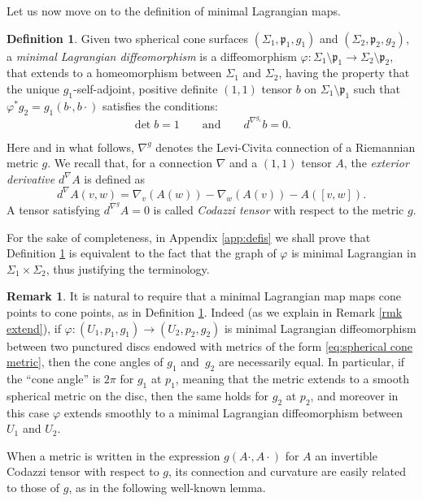 \documentclass[11pt]{article}
\theoremstyle{definition}
\newtheorem{defi}[cor]{Definition}
\newtheorem{remark}[cor]{Remark}
\begin{document}
Let us now move on to the definition of minimal Lagrangian maps.

\begin{defi} \label{defi min lag}
Given two spherical cone surfaces $(\Sigma_1,\mathfrak p_1,g_1)$ and $(\Sigma_2,\mathfrak p_2,g_2)$, a \emph{minimal Lagrangian diffeomorphism} is a diffeomorphism $\varphi:\Sigma_1\setminus\mathfrak p_1\to\Sigma_2\setminus\mathfrak p_2$, that extends to a homeomorphism between $\Sigma_1$ and $\Sigma_2$, having the property that the unique $g_1$-self-adjoint, positive definite $(1,1)$ tensor $b$ on $\Sigma_1\setminus \mathfrak p_1$ such that $\varphi^*g_2=g_1(b\cdot,b\cdot)$ satisfies the conditions:
\begin{equation}\label{eq:defi min lag}
\det b=1\qquad\text{and}\qquad d^{\nabla^{g_1}}\!b=0.
\end{equation}
\end{defi}

Here and in what follows, $\nabla^g$ denotes the Levi-Civita connection of a Riemannian metric $g$. We recall that, for a connection $\nabla$ and a $(1,1)$ tensor $A$, the \emph{exterior derivative} $d^\nabla \!\!A$ is defined as
\[
d^\nabla \!\!A(v,w)=\nabla_v(A(w))-\nabla_w(A(v))-A([v,w]).
\]
A tensor satisfying $d^{\nabla^g}\!\!A=0$ is called \emph{Codazzi tensor} with respect to the metric $g$.

For the sake of completeness, in Appendix \ref{app:defis} we shall prove that Definition \ref{defi min lag} is equivalent to the fact that the graph of $\varphi$ is minimal Lagrangian in $\Sigma_1\times\Sigma_2$, thus justifying the terminology.

\begin{remark}
It is natural to require that a minimal Lagrangian map maps cone points to cone points, as in Definition \ref{defi min lag}. Indeed (as we explain in Remark \ref{rmk extend}), if $\varphi:(U_1,p_1,g_1)\to (U_2,p_2,g_2)$ is minimal Lagrangian diffeomorphism between two punctured discs endowed with metrics of the form \eqref{eq:spherical cone metric}, then the cone angles of $g_1$ and~$g_2$ are necessarily equal. In particular, if the ``cone angle'' is $2\pi$ for $g_1$ at $p_1$, meaning that the metric extends to a smooth spherical metric on the disc, then the same holds for $g_2$ at $p_2$, and moreover in this case $\varphi$ extends smoothly to a minimal Lagrangian diffeomorphism between $U_1$ and $U_2$.
\end{remark}

When a metric is written in the expression $g(A\cdot,A\cdot)$ for $A$ an invertible Codazzi tensor with respect to $g$, its connection and curvature are easily related to those of $g$, as in the following well-known lemma.
\end{document}
